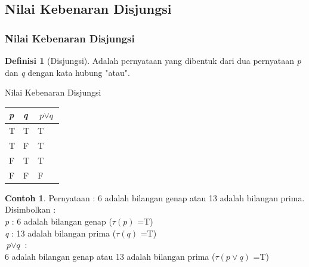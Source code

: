 \documentclass[handout]{beamer}
\theoremstyle{definition}
\newtheorem{definisi}[theorem]{Definisi}
\theoremstyle{example}
\newtheorem{contoh}[theorem]{Contoh}
\begin{document}
\subsection{Nilai Kebenaran Disjungsi}
\begin{frame}[shrink]
	\frametitle{Nilai Kebenaran Disjungsi}
	\begin{definisi}[Disjungsi]
		Adalah pernyataan yang dibentuk dari dua pernyataan \textit{p} dan \textit{q} dengan kata hubung "atau".   	
	\end{definisi}
	\begin{block}{Nilai Kebenaran Disjungsi}
		\begin{tabular}{ | l | l | l | }
			\hline
			\textit{p} & \textit{q} & $\textit{p}\vee\textit{q}$ \\ \hline
			T & T & T \\ \hline
			T & F & T \\ \hline
			F & T & T \\ \hline
			F & F & F \\     		 
			\hline
		\end{tabular}
	\end{block}
	
	\begin{contoh}
		Pernyataan : 6 adalah bilangan genap atau 13 adalah bilangan prima.
		 \\
		Disimbolkan :\\
		\textit{p} : 6 adalah bilangan genap ($\tau(\textit{p})$ =T)\\
		\textit{q} : 13 adalah bilangan prima ($\tau(\textit{q})$ =T)\\
		$\textit{p}\vee\textit{q}$ : \\6 adalah bilangan genap atau 13 adalah bilangan prima ($\tau(\textit{p}\vee\textit{q})$ =T)
	\end{contoh}	
	
\end{frame}
\end{document}
